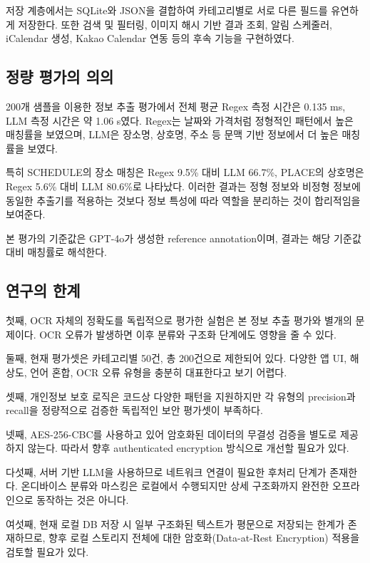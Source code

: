 \documentclass[11pt,a4paper]{article}
\begin{document}
저장 계층에서는 SQLite\cite{ref_sqlite}와 JSON을 결합하여 카테고리별로 서로 다른 필드를 유연하게 저장한다. 또한 검색 및 필터링, 이미지 해시 기반 결과 조회, 알림 스케줄러, iCalendar 생성, Kakao Calendar 연동 등의 후속 기능을 구현하였다.

\subsection{정량 평가의 의의}

200개 샘플을 이용한 정보 추출 평가에서 전체 평균 Regex 측정 시간은 0.135 ms, LLM 측정 시간은 약 1.06 s였다. Regex는 날짜와 가격처럼 정형적인 패턴에서 높은 매칭률을 보였으며, LLM은 장소명, 상호명, 주소 등 문맥 기반 정보에서 더 높은 매칭률을 보였다.

특히 SCHEDULE의 장소 매칭은 Regex 9.5\% 대비 LLM 66.7\%, PLACE의 상호명은 Regex 5.6\% 대비 LLM 80.6\%로 나타났다. 이러한 결과는 정형 정보와 비정형 정보에 동일한 추출기를 적용하는 것보다 정보 특성에 따라 역할을 분리하는 것이 합리적임을 보여준다.

본 평가의 기준값은 GPT-4o가 생성한 reference annotation이며, 결과는 해당 기준값 대비 매칭률로 해석한다.

\subsection{연구의 한계}

첫째, OCR 자체의 정확도를 독립적으로 평가한 실험은 본 정보 추출 평가와 별개의 문제이다. OCR 오류가 발생하면 이후 분류와 구조화 단계에도 영향을 줄 수 있다.

둘째, 현재 평가셋은 카테고리별 50건, 총 200건으로 제한되어 있다. 다양한 앱 UI, 해상도, 언어 혼합, OCR 오류 유형을 충분히 대표한다고 보기 어렵다.

셋째, 개인정보 보호 로직은 코드상 다양한 패턴을 지원하지만 각 유형의 precision과 recall을 정량적으로 검증한 독립적인 보안 평가셋이 부족하다.

넷째, AES-256-CBC를 사용하고 있어 암호화된 데이터의 무결성 검증을 별도로 제공하지 않는다. 따라서 향후 authenticated encryption 방식으로 개선할 필요가 있다.

다섯째, 서버 기반 LLM을 사용하므로 네트워크 연결이 필요한 후처리 단계가 존재한다. 온디바이스 분류와 마스킹은 로컬에서 수행되지만 상세 구조화까지 완전한 오프라인으로 동작하는 것은 아니다.

여섯째, 현재 로컬 DB 저장 시 일부 구조화된 텍스트가 평문으로 저장되는 한계가 존재하므로, 향후 로컬 스토리지 전체에 대한 암호화(Data-at-Rest Encryption) 적용을 검토할 필요가 있다.
\end{document}
